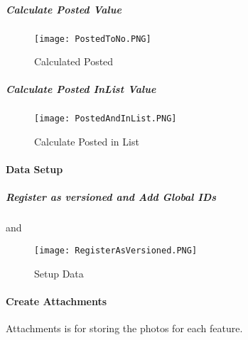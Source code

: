  \subparagraph{Calculate Posted Value}

   \begin{figure}[h!]
  \centering
      \texttt{[image: PostedToNo.PNG]}
  \caption{Calculated Posted}
  \end{figure}


 \subparagraph{Calculate Posted InList Value}

   \begin{figure}[h!]
  \centering
      \texttt{[image: PostedAndInList.PNG]}
  \caption{Calculate Posted in List}
  \end{figure}


 \clearpage










  \paragraph{Data Setup}
  \vspace{.2in}

 \subparagraph{Register as versioned and Add Global IDs}


  \vspace{.2in}

  \vspace{.2in}

  and
  \vspace{.2in}

  \vspace{.2in}

  \begin{figure}[h!]
  \centering
      \texttt{[image: RegisterAsVersioned.PNG]}
  \caption{Setup Data}
  \end{figure}
  \clearpage
  \paragraph[Create Attachments]{\Large Create Attachments\texorpdfstring{\\}{}}
 Attachments is for storing the photos for each feature.

  \vspace{.3in}

